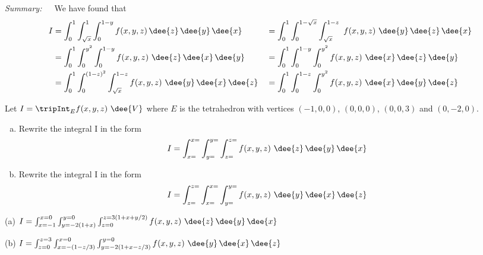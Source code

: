 \begin{solution}
\emph{Summary:}\ \ \ 
We have found that
\begin{alignat*}{3}
I&= \int_0^1 \int_{\sqrt{x}}^1 \int_0^{1-y} f(x,y,z)\,\dee{z}\,\dee{y}\,\dee{x}
&&=\int_0^1 \int_0^{1-\sqrt{x}} \int_{\sqrt{x}}^{1-z}
                \ f(x,y,z)\  \dee{y}\,\dee{z}\,\dee{x} \\
&=\int_0^1  \int_0^{y^2}\int_0^{1-y}f(x,y,z)\ 
                   \dee{z}\,\dee{x}\, \dee{y}
&&=\int_0^1  \int_0^{1-y} \int_0^{y^2} f(x,y,z)\ 
                   \dee{x}\, \dee{z}\,\dee{y} \\
&=\int_0^1  \int_0^{(1-z)^2} \int_{\sqrt{x}}^{1-z}f(x,y,z)\ 
                   \dee{y}\,\dee{x}\, \dee{z}
&&=\int_0^1  \int_0^{1-z} \int_0^{y^2} f(x,y,z)\ 
                   \dee{x}\, \dee{y}\,\dee{z}
\end{alignat*}

\end{solution}

\begin{question}[M200 2009A] %
Let $\displaystyle I = \tripInt_E f(x,y,z)\ \dee{V}$ 
where $E$ is the tetrahedron with vertices $(-1, 0, 0)$,
$(0, 0, 0)$, $(0, 0, 3)$ and $(0, -2, 0)$.


\begin{enumerate}[(a)]
\item
Rewrite the integral I in the form
\begin{equation*}
I = \int_{x=}^{x=}\int_{y=}^{y=}\int_{z=}^{z=} f(x,y,z)\ 
                                      \dee{z}\,\dee{y}\,\dee{x}
\end{equation*}

\item
Rewrite the integral I in the form
\begin{equation*}
I = \int_{z=}^{z=}\int_{x=}^{x=}\int_{y=}^{y=} f(x,y,z)\ 
                                      \dee{y}\,\dee{x}\,\dee{z}
\end{equation*}
\end{enumerate}
\end{question}

%

\begin{answer}
(a) $I = \int_{x=-1}^{x=0}\int_{y=-2(1+x)}^{y=0}\int_{z=0}^{z=3(1+x+y/2)} 
            f(x,y,z)\ \dee{z}\,\dee{y}\,\dee{x}$

(b) $I = \int_{z=0}^{z=3}\int_{x=-(1-z/3)}^{x=0}\int_{y=-2(1+x-z/3)}^{y=0} 
             f(x,y,z)\ \dee{y}\,\dee{x}\,\dee{z}$
\end{answer}

